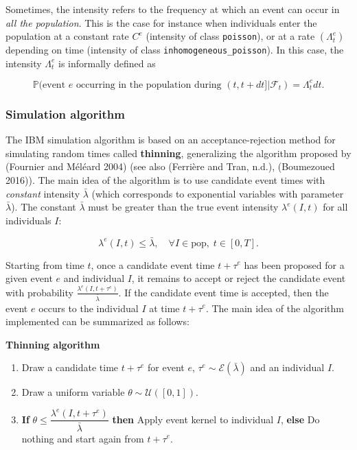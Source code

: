 Sometimes, the intensity refers to the frequency at which an event can occur in \emph{all the population}. This is the case for instance when individuals enter the population at a constant rate \(C^e\) (intensity of class \texttt{poisson}), or at a rate \((\Lambda^e_t)\) depending on time (intensity of class \texttt{inhomogeneous\_poisson}). In this case, the intensity \(\Lambda^e_t\) is informally defined as

\begin{equation}
\mathbb{P}(\text{event } e \text{ occurring in the population during } (t,t+dt] | \mathcal{F}_t) = \Lambda^e_t dt.
\end{equation}

\hypertarget{algo}{%
\subsubsection{Simulation algorithm}\label{algo}}

The IBM simulation algorithm is based on an acceptance-rejection method for simulating random times called \textbf{thinning}, generalizing the algorithm proposed by (Fournier and Méléard 2004) (see also (Ferrière and Tran, n.d.), (Boumezoued 2016)).
The main idea of the algorithm is to use candidate event times with \emph{constant} intensity \(\bar \lambda\) (which corresponds to exponential variables with parameter \(\bar \lambda\)). The constant \(\bar \lambda\) must be greater than the true event intensity \(\lambda^e(I,t)\) for all individuals \(I\):

\begin{equation}
\lambda^e(I,t) \leq \bar{\lambda}, \quad \forall I \in \text{pop}, \; t \in [0,T].
\end{equation}

Starting from time \(t\), once a candidate event time \(t + \tau^e\) has been proposed for a given event \(e\) and individual \(I\), it remains to accept or reject the candidate event with probability \(\frac{\lambda^e(I,t+\tau^e)}{\bar{\lambda}}\). If the candidate event time is accepted, then the event \(e\) occurs to the individual \(I\) at time \(t + \tau^e\). The main idea of the algorithm implemented can be summarized as follows:

\textbf{Thinning algorithm}

\begin{enumerate}
\def\labelenumi{\arabic{enumi}.}
\tightlist
\item
  Draw a candidate time \(t+\tau^e\) for event \(e\), \(\tau^e \sim \mathcal E(\bar \lambda)\) and an individual \(I\).
\item
  Draw a uniform variable \(\theta \sim \mathcal U([0,1])\).
\item
  \textbf{If} \(\theta \leq \dfrac{\lambda^e(I,t+\tau^e)}{\bar\lambda}\) \textbf{then} Apply event kernel to individual \(I\),
  \textbf{else} Do nothing and start again from \(t+\tau^e\).
\end{enumerate}


